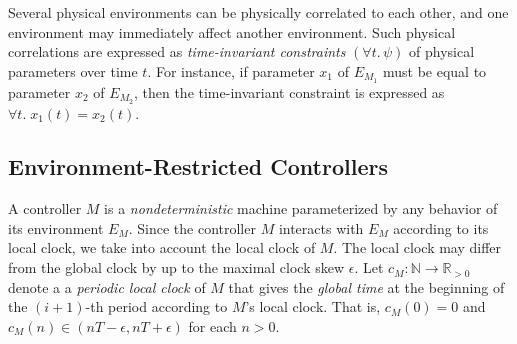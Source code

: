 Several physical environments can be physically correlated to each other,
and one %
environment may immediately affect  another environment.
Such physical correlations are %
expressed as
\emph{time-invariant constraints} $(\forall t.\, \psi)$ of physical parameters over time $t$.
For instance, if %
parameter $x_1$ of $E_{M_1}$
must be equal to parameter $x_2$ of %
$E_{M_2}$,
then the time-invariant constraint is expressed as %
$\forall t.\; x_1(t) = x_2(t)$.




\subsection{Environment-Restricted Controllers}
\label{sec:env-res}

A controller $M$ is a \emph{nondeterministic} machine
parameterized by any behavior of its %
environment $E_M$.
%
Since 
the controller 
$M$ interacts  with %
$E_M$
according to its local clock,
we take into account the local clock of $M$.
The local clock %
may  differ from the global clock by up to  
the maximal clock skew $\epsilon$.
Let $c_M : \mathbb{N} \to \mathbb{R}_{>0}$ denote a a \emph{periodic local clock} of $M$
that gives the \emph{global time} at the
beginning of the $(i+1)$-th period according to $M$'s local clock. 
That is,  $c_M(0) = 0$
and
$c_M(n) \in (n T - \epsilon, n T + \epsilon)$ for each $n > 0$.



